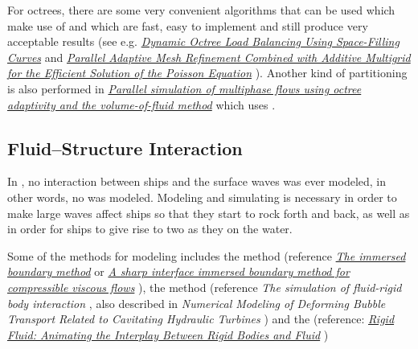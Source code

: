 For octrees, there are some very convenient algorithms that can be used which make use of  and which are fast, easy to implement and still produce very acceptable results (see e.g. \textit{\href{http://j.teresco.org/research/publications/octpart02/octpart02.pdf}{Dynamic Octree Load Balancing Using Space-Filling Curves}} \citep{temp} and \textit{\href{http://downloads.isrn.com/journals/appmath/2012/246491.pdf}{Parallel Adaptive Mesh Refinement Combined with Additive Multigrid for the Efficient Solution of the Poisson Equation}} \citep{temp}). Another kind of partitioning is also performed in \textit{\href{http://gfs.sourceforge.net/papers/agbaglah2011.pdf}{Parallel simulation of multiphase flows using octree adaptivity and the volume-of-fluid method}} \citep{temp} which uses .

\subsection{Fluid--Structure Interaction}

In \thisprojectwork, no interaction between ships and the surface waves was ever modeled, in other words, no \FSI was modeled. Modeling and simulating \FSI is necessary in order to make large waves affect ships so that they start to rock forth and back, as well as in order for ships to give rise to two  as they \sail on the water.
    
Some of the methods for modeling \FSI includes the \IB method (reference \textit{\href{http://www4.ncsu.edu/~zhilin/TEACHING/MA798Z/Peskin1.pdf}{The immersed boundary method}} \citep{temp} or \textit{\href{http://www.cecs.wright.edu/~haibo.dong/wp-content/themes/publications/IBM_JCP_2007.pdf}{A sharp interface immersed boundary method for compressible viscous flows}} \citep{temp}), the \VOS method (reference \textit{The simulation of fluid-rigid body interaction} \citep{temp}, also described in \textit{Numerical Modeling of Deforming Bubble Transport Related to Cavitating Hydraulic Turbines} \citep{temp}) and the  (reference: \textit{\href{http://www.amath.unc.edu/Faculty/mucha/Reprints/siggraph04.pdf}{Rigid Fluid: Animating the Interplay Between Rigid Bodies and Fluid}} \citep{temp})

